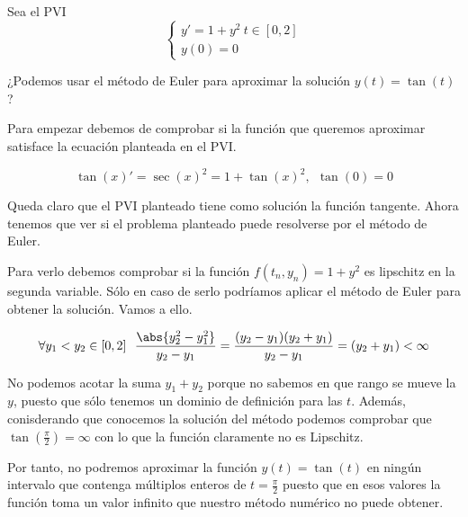 \begin{problem}[3]
Sea el PVI
\[\left\{ \begin{array}{l}y'=1+y^2 \ t \in [0,2] \\
y(0)=0\end{array}
\right.\]

¿Podemos usar el método de Euler para aproximar la solución $y(t)=\tan(t)$?

\solution

Para empezar debemos de comprobar si la función que queremos aproximar satisface la ecuación planteada en el PVI.

\[\tan(x)' = \sec(x)^2 = 1 + \tan(x)^2, \ \ \tan(0)=0\]

Queda claro que el PVI planteado tiene como solución la función tangente. Ahora tenemos que ver si el problema planteado puede resolverse por el método de Euler.

Para verlo debemos comprobar si la función $f(t_n,y_n)=1+y^2$ es lipschitz en la segunda variable. Sólo en caso de serlo podríamos aplicar el método de Euler para obtener la solución. Vamos a ello.

\[\forall y_1<y_2 \in [0,2] \ \ \frac{\abs{y_2^2 - y_1^2}}{y_2-y_1}=\frac{(y_2-y_1)(y_2+y_1)}{y_2-y_1} = (y_2+y_1)< \infty\]

\obs No podemos acotar la suma $y_1+y_2$ porque no sabemos en que rango se mueve la $y$, puesto que sólo tenemos un dominio de definición para las $t$. Además, conisderando que conocemos la solución del método podemos comprobar que $\tan\left(\frac{π}{2}\right)=\infty$ con lo que la función claramente no es Lipschitz.

Por tanto, no podremos aproximar la función $y(t)=\tan(t)$ en ningún intervalo que contenga múltiplos enteros de $t=\frac{π}{2}$ puesto que en esos valores la función toma un valor infinito que nuestro método numérico no puede obtener.
\end{problem}


